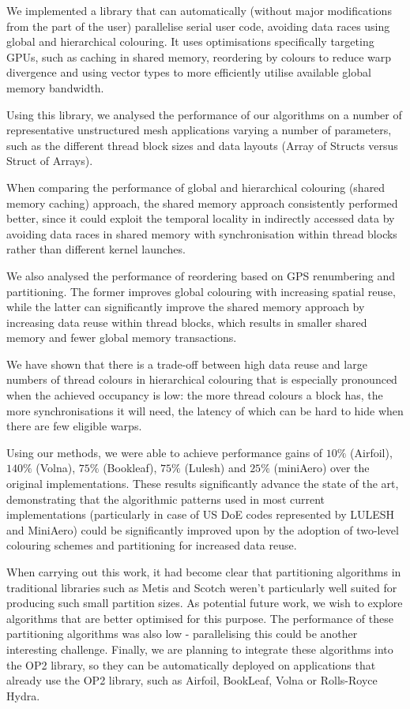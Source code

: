 We implemented a library that can automatically (without major modifications
from the part of the user) parallelise serial user code, avoiding data races
using global and hierarchical colouring. It uses optimisations specifically
targeting GPUs, such as caching in shared memory, reordering by colours to
reduce warp divergence and using vector types to more efficiently utilise
available global memory bandwidth.

Using this library, we analysed the performance of our algorithms on a number of
representative unstructured mesh applications varying a number of parameters,
such as the different thread block sizes and data layouts (Array of Structs
versus Struct of Arrays).

When comparing the performance of global and hierarchical colouring (shared
memory caching) approach, the shared memory approach consistently performed
better, since it could exploit the temporal locality in indirectly accessed data
by avoiding data races in shared memory with synchronisation within thread
blocks rather than different kernel launches.

We also analysed the performance of reordering based on GPS renumbering and
partitioning. The former improves global colouring with increasing spatial
reuse, while the latter can significantly improve the shared memory approach by
increasing data reuse within thread blocks, which results in smaller shared
memory and fewer global memory transactions.

We have shown that there is a trade-off between high data reuse and large
numbers of thread colours in hierarchical colouring that is especially
pronounced when the achieved occupancy is low: the more thread colours a block
has, the more synchronisations it will need, the latency of which can be hard to
hide when there are few eligible warps.

Using our methods, we were able to achieve performance gains of $10\%$
(Airfoil), $140\%$ (Volna), $75\%$ (Bookleaf), $75\%$ (Lulesh) and $25\%$
(miniAero) over the original implementations. These results significantly
advance the state of the art, demonstrating that the algorithmic patterns used
in most current implementations (particularly in case of US DoE codes
represented by LULESH and MiniAero) could be significantly improved upon by the
adoption of two-level colouring schemes and partitioning for increased data
reuse.

When carrying out this work, it had become clear that partitioning algorithms in
traditional libraries such as Metis and Scotch weren't particularly well suited
for producing such small partition sizes. As potential future work, we wish to
explore algorithms that are better optimised for this purpose. The performance
of these partitioning algorithms was also low - parallelising this could be
another interesting challenge. Finally, we are planning to integrate these
algorithms into the OP2 library, so they can be automatically deployed on
applications that already use the OP2 library, such as Airfoil, BookLeaf, Volna
or Rolls-Royce Hydra.

